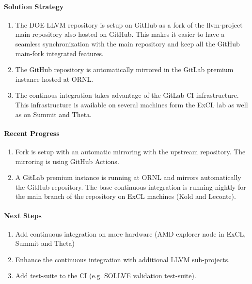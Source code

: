 \paragraph{Solution Strategy}

\begin{enumerate}

\item The DOE LLVM repository is setup on GitHub as a fork of the llvm-project
      main repository also hosted on GitHub. This makes it easier to have a
      seamless synchronization with the main repository and keep all the
      GitHub main-fork integrated features.

\item The GitHub repository is automatically mirrored in the GitLab premium
      instance hosted at ORNL.

\item The continous integration takes advantage of the GitLab CI infrastructure.
      This infrastructure is available on several machines form the ExCL lab as
      well as on Summit and Theta.

\end{enumerate}


\paragraph{Recent Progress}

\begin{enumerate}
\item Fork is setup with an automatic mirroring with the upstream repository.
      The mirroring is using GitHub Actions.

\item A GitLab premium instance is running at ORNL and mirrors automatically the
      GitHub repository. The base continuous integration is running nightly
      for the main branch of the repository on ExCL machines (Kold and Leconte).
\end{enumerate}


\paragraph{Next Steps}

\begin{enumerate}
\item Add continuous integration on more hardware (AMD explorer node in ExCL,
      Summit and Theta)
\item Enhance the continuous integration with additional LLVM sub-projects.
\item Add test-suite to the CI (e.g. SOLLVE validation test-suite).
\end{enumerate}
